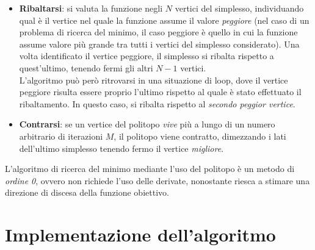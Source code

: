 \documentclass[a4paper, 11pt]{article}
\begin{document}
\begin{itemize}
\item \textbf{Ribaltarsi}: si valuta la funzione negli $N$ vertici del
simplesso, individuando qual è il vertice nel quale la funzione assume il valore
\emph{peggiore} (nel caso di un problema di ricerca del minimo, il caso peggiore
è quello in cui la funzione assume valore più grande tra tutti i vertici del
simplesso considerato). Una volta identificato il vertice peggiore, il simplesso
si ribalta rispetto a quest'ultimo, tenendo fermi gli altri $N-1$ vertici. \\
L'algoritmo può però ritrovarsi in una situazione di loop, dove il vertice
peggiore risulta essere proprio l'ultimo rispetto al quale è stato effettuato il
ribaltamento. In questo caso, si ribalta rispetto al \emph{secondo peggior
vertice}. 
\item \textbf{Contrarsi}: se un vertice del politopo \emph{vive} più a lungo di
un numero arbitrario di iterazioni $M$, il politopo viene contratto, dimezzando
i lati dell'ultimo simplesso tenendo fermo il vertice \emph{migliore}.
\end{itemize}

\noindent
L'algoritmo di ricerca del minimo mediante l'uso del politopo è un metodo di
\emph{ordine 0}, ovvero non richiede l'uso delle derivate, nonostante riesca a
stimare una direzione di discesa della funzione obiettivo.

\section*{Implementazione dell'algoritmo}
\end{document}
